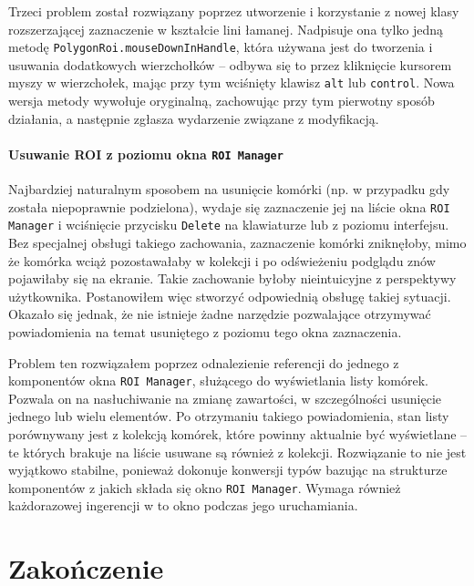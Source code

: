 \documentclass[declaration,shortabstract,mgr]{iithesis}
\begin{document}
Trzeci problem został rozwiązany poprzez utworzenie i korzystanie z nowej klasy rozszerzającej zaznaczenie w kształcie lini łamanej.
Nadpisuje ona tylko jedną metodę \texttt{PolygonRoi.mouseDownInHandle}, która używana jest do tworzenia i usuwania dodatkowych wierzchołków -- odbywa się to przez kliknięcie kursorem myszy w wierzchołek, mając przy tym wciśnięty klawisz \texttt{alt} lub \texttt{control}.
Nowa wersja metody wywołuje oryginalną, zachowując przy tym pierwotny sposób działania, a następnie zgłasza wydarzenie związane z modyfikacją.

\subsubsection{Usuwanie ROI z poziomu okna \texttt{ROI Manager}}

Najbardziej naturalnym sposobem na usunięcie komórki (np. w przypadku gdy została niepoprawnie podzielona), wydaje się zaznaczenie jej na liście okna \texttt{ROI Manager} i wciśnięcie przycisku \texttt{Delete} na klawiaturze lub z poziomu interfejsu.
Bez specjalnej obsługi takiego zachowania, zaznaczenie komórki zniknęłoby, mimo że komórka wciąż pozostawałaby w kolekcji i po odświeżeniu podglądu znów pojawiłaby się na ekranie.
Takie zachowanie byłoby nieintuicyjne z perspektywy użytkownika.
Postanowiłem więc stworzyć odpowiednią obsługę takiej sytuacji.
Okazało się jednak, że nie istnieje żadne narzędzie pozwalające otrzymywać powiadomienia na temat usuniętego z poziomu tego okna zaznaczenia.

Problem ten rozwiązałem poprzez odnalezienie referencji do jednego z komponentów okna \texttt{ROI Manager}, służącego do wyświetlania listy komórek.
Pozwala on na nasłuchiwanie na zmianę zawartości, w szczególności usunięcie jednego lub wielu elementów.
Po otrzymaniu takiego powiadomienia, stan listy porównywany jest z kolekcją komórek, które powinny aktualnie być wyświetlane -- te których brakuje na liście usuwane są również z kolekcji.
Rozwiązanie to nie jest wyjątkowo stabilne, ponieważ dokonuje konwersji typów bazując na strukturze komponentów z jakich składa się okno \texttt{ROI Manager}.
Wymaga również każdorazowej ingerencji w to okno podczas jego uruchamiania.



\chapter{Zakończenie}
\end{document}

